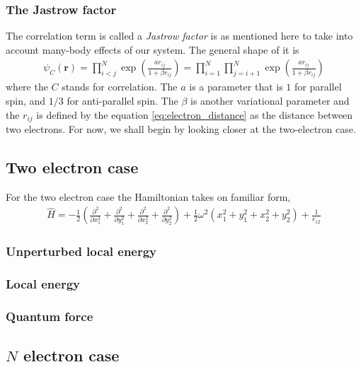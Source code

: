 \documentclass[11pt]{article}
\begin{document}
\subsubsection{The Jastrow factor}
The correlation term is called a \textit{Jastrow factor} is as mentioned here to take into account many-body effects of our system. The general shape of it is
\begin{align}
	\psi_C(\mathbf{r}) = \prod_{i<j}^N \exp{\left(\frac{ar_{ij}}{1 + \beta r_{ij}}\right)} = \prod_{i=1}^N \prod_{j=i+1}^N \exp{\left(\frac{ar_{ij}}{1 + \beta r_{ij}}\right)}
	\label{eq:WF_jastrow}
\end{align}
where the $C$ stands for correlation. The $a$ is a parameter that is $1$ for parallel spin, and $1/3$ for anti-parallel spin. The $\beta$ is another variational parameter and the $r_{ij}$ is defined by the equation \eqref{eq:electron_distance} as the distance between two electrons. For now, we shall begin by looking closer at the two-electron case.




\subsection{Two electron case}
For the two electron case the Hamiltonian takes on familiar form,
\begin{align}
	\hat{H} = -\frac{1}{2}\left(\frac{\partial^2}{\partial x^2_1} + \frac{\partial^2}{\partial y^2_1} + \frac{\partial^2}{\partial x^2_2} + \frac{\partial^2}{\partial y^2_2}\right) + \frac{1}{2}\omega^2(x^2_1 + y^2_1 + x^2_2 + y^2_2) + \frac{1}{r_{12}}
	\label{eq:hamiltonian_two_electron}
\end{align}

\subsubsection{Unperturbed local energy}

\subsubsection{Local energy}

\subsubsection{Quantum force}



\subsection{\texorpdfstring{$N$}{N} electron case}
\end{document}
